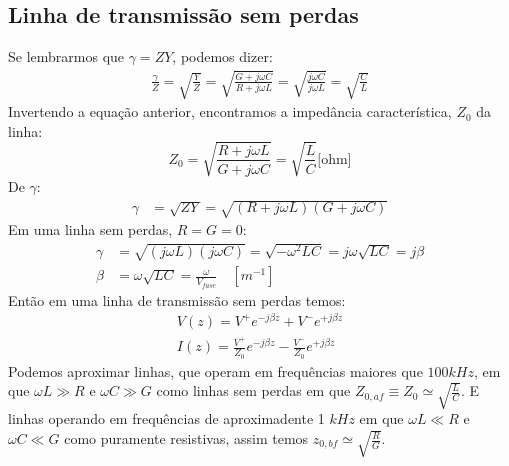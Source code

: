 \documentclass[11pt,a4paper]{article}
\begin{document}
\subsection{Linha de transmissão sem perdas}
Se lembrarmos que $\gamma = ZY$, podemos dizer:
\begin{align*}
\frac{ \gamma }{Z} = \sqrt{ \frac{Y}{Z}} =\sqrt{\frac{G+ j \omega C}{R+ j \omega L}}= \sqrt{\frac{j \omega C}{j \omega L}}= \sqrt{\frac{C}{L}}
\end{align*}
Invertendo a equação anterior, encontramos a impedância característica, $Z_0$ da linha:
\begin{equation*}
  Z_0= \sqrt{ \frac{R+j \omega L}{G+ j \omega C} } =\sqrt{ \frac{L}{C} } \text{[ohm]}
\end{equation*}
De $\gamma$:
\begin{align*}
  \gamma & = \sqrt{ZY} = \sqrt{(R + j \omega L)(G + j \omega C)} 
\end{align*}
Em uma linha sem perdas, $R=G=0$:
\begin{align*}
  \gamma &= \sqrt{(j \omega L)(j \omega C)}=\sqrt{-\omega^2 LC}=j\omega \sqrt{LC} = j \beta \\
  \beta &= \omega \sqrt{LC} = \frac{\omega}{V_{fase}} \quad [m^{-1}]
\end{align*}
Então em uma linha de transmissão sem perdas temos:
\begin{align*}
V(z)= V^+ e^{-j \beta z} + V^- e^{+j \beta z} \\
I(z)= \frac{V^+}{Z_0} e^{-j \beta z} - \frac{V^-}{Z_0} e^{+j \beta z}
\end{align*}
Podemos aproximar linhas, que operam em frequências maiores que $100kHz$,  em que $\omega L \gg R$ e  $\omega C \gg G$  como linhas sem perdas em que $Z_{0,af} \equiv Z_0 \simeq \sqrt{\frac{L}{C}}$. E linhas operando em frequências de aproximadente 1 $kHz$ em que $\omega L \ll R$ e $ \omega C \ll G$ como puramente resistivas, assim temos $z_{0,bf} \simeq \sqrt{\frac{R}{G}}$.
\end{document}
